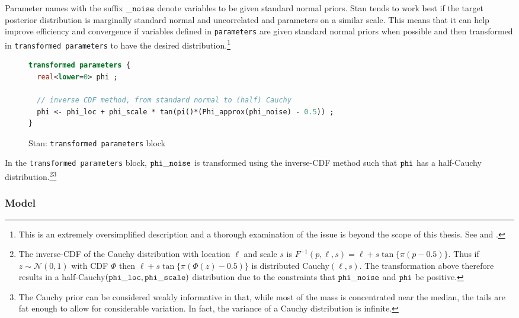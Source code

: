 %
\noindent Parameter names with the suffix ${\tt \_noise}$ denote variables to be given standard normal priors. Stan tends to work best if the target posterior distribution is marginally standard normal and uncorrelated and parameters on a  similar scale. This means that it can help improve efficiency and convergence if variables defined in {\tt parameters} are given standard normal priors when possible and then transformed in {\tt transformed parameters} to have the desired distribution.\footnote{This is an extremely oversimplified description and a thorough examination of the issue is beyond the scope of this thesis. See  and .} 

\begin{figure}[h]
\begin{lstlisting}[language=Stan, frame=trBL]
transformed parameters {
  real<lower=0> phi ;
  
  // inverse CDF method, from standard normal to (half) Cauchy
  phi <- phi_loc + phi_scale * tan(pi()*(Phi_approx(phi_noise) - 0.5)) ;
}
\end{lstlisting}
\caption{Stan: {\tt transformed parameters} block}
\label{stan_transformed_parameters}
\end{figure}

In the {\tt transformed parameters} block, ${\tt phi\_noise}$ is transformed using the inverse-CDF method such that ${\tt phi}$ has a half-Cauchy distribution.\footnote{The inverse-CDF of the Cauchy distribution with location $\ell$ and scale $s$ is $F^{-1}(p, \ell,s)  = \ell + s \tan{\{ \pi (p - 0.5)\}}$. Thus if $z \sim \mathcal{N}(0,1)$ with CDF $\Phi$ then $\ell + s \tan{\{ \pi (\Phi(z) - 0.5)\}}$ is distributed Cauchy$(\ell, s)$. The transformation above therefore results in a half-Cauchy$({\tt phi\_loc}, {\tt phi\_scale})$ distribution due to the constraints that ${\tt phi\_noise}$ and ${\tt phi}$ be positive.}\footnote{The Cauchy prior can be considered weakly informative in that, while most of the mass is concentrated near the median, the tails are fat enough to allow for considerable variation. In fact, the variance of a Cauchy distribution is infinite.}



\subsubsection{Model}

